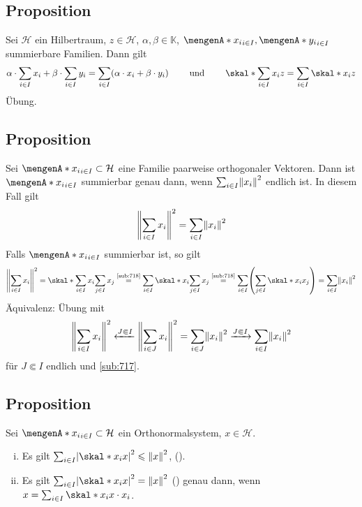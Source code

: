 \subsection{Proposition} %
\label{sub:718}
Sei $\mathcal{H}$ ein Hilbertraum, $z \in \mathcal{H}$, $\alpha, \beta \in \mathds{K}$, $\set{x_i}_{i \in I}, \set{y_i}_{i \in I}$ summierbare Familien. Dann gilt
\begin{align*}
	\alpha \cdot \sum_{i \in I} x_i + \beta \cdot \sum_{i \in I} y_i = \sum_{i \in I} \enbrace*{\alpha \cdot x_i + \beta \cdot y_i} 
	\qquad \text{ und } \qquad 
	\skal*{\sum_{i \in I} x_i}{z} = \sum_{i \in I} \skal*{x_i}{z}
\end{align*}
Übung. \bewende

\subsection[Proposition: Kriterium für die Summierbarkeit orthogonaler Vektoren]{Proposition} %
\label{sub:719}
Sei $\set{x_i}_{i \in I}\subset \mathcal{H}$ eine Familie paarweise orthogonaler Vektoren. Dann ist $\set{x_i}_{i \in I}$ summierbar genau dann, wenn 
$\sum_{i \in I} \norm{x_i}^2$ endlich ist. In diesem Fall gilt
\[
	\norm{\sum_{i \in I}x_i}^2 = \sum_{i \in I} \norm{x_i}^2  
\]
Falls $\set{x_i}_{i \in I}$ summierbar ist, so gilt
\begin{align*}
	\norm{\sum_{i \in I} x_i}^2 =  
	\skal*{\sum_{i \in I}x_i}{\sum_{j \in I} x_j} \stackrel{\text{\ref{sub:718}}}{=} \sum_{i \in I} \skal*{x_i}{\sum_{j \in I} x_j}\stackrel{\text{\ref{sub:718}}}{=}
	\sum_{i \in I} \enbrace*{\sum_{j \in I} \skal*{x_i}{x_j}} = \sum_{i \in I} \norm{x_i}^2  
\end{align*}
Äquivalenz: Übung mit 
\[
	\norm{\sum_{i \in I}x_i}^2 \xleftarrow{J \Subset I}\norm{\sum_{i \in J} x_i}^2 = \sum_{i \in J} \norm{x_i}^2 \xrightarrow{J \Subset I} \sum_{i \in I} \norm{x_i}^2  
\]
für $J \Subset I$ endlich und \ref{sub:717}. \bewende

\subsection{Proposition} %
\label{sub:720}
Sei $\set{x_i}_{i \in I} \subset \mathcal{H}$ ein Orthonormalsystem, $x \in \mathcal{H}$. 
\begin{enumerate}[(i)]
	\item Es gilt $\sum_{i \in I} \abs*{\skal*{x_i}{x}}^2 \le \norm{x}^2$, ().
	\item Es gilt $\sum_{i \in I} \abs*{\skal*{x_i}{x}}^2 = \norm{x}^2$ () genau dann, wenn $x= \sum_{i \in I} \skal*{x_i}{x} \cdot x_i$.
\end{enumerate}


